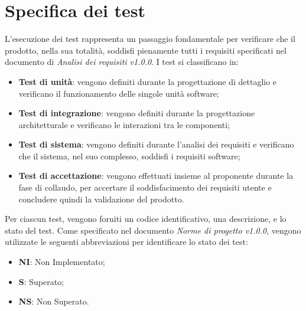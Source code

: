 \section{Specifica dei test}
L'esecuzione dei test rappresenta un passaggio fondamentale per verificare che
il prodotto, nella sua totalità, soddisfi pienamente tutti i requisiti
specificati nel documento di \textit{Analisi dei requisiti v1.0.0}. I test si
classificano in:
\begin{itemize}
    \item \textbf{Test di unità}: vengono definiti durante la progettazione di
          dettaglio e verificano il funzionamento delle singole unità software;
    \item \textbf{Test di integrazione}: vengono definiti durante la progettazione
          architetturale e verificano le interazioni tra le componenti;
    \item \textbf{Test di sistema}: vengono definiti durante l'analisi dei requisiti
          e verificano che il sistema, nel suo complesso, soddisfi i requisiti software;
    \item \textbf{Test di accettazione}: vengono effettuati insieme al proponente
          durante la fase di collaudo, per accertare il soddisfacimento dei requisiti utente
          e concludere quindi la validazione del prodotto.
\end{itemize}
Per ciascun test, vengono forniti un codice identificativo, una descrizione, e
lo stato del test.
Come specificato nel documento \textit{Norme di progetto v1.0.0}, vengono utilizzate le seguenti
abbreviazioni per identificare lo stato dei test:
\begin{itemize}
    \item \textbf{NI}: Non Implementato;
    \item \textbf{S}: Superato;
    \item \textbf{NS}: Non Superato.
\end{itemize}


